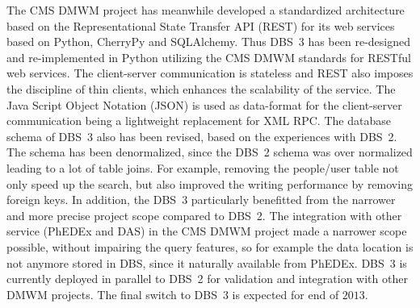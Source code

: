 The CMS DMWM project has meanwhile developed a standardized architecture based on the Representational State Transfer API (REST) \cite{REST} for its web services based on Python, CherryPy and SQLAlchemy. Thus DBS~3 has been re-designed and re-implemented in Python utilizing the CMS DMWM standards for RESTful web services. The client-server communication is stateless and REST also imposes the discipline of thin clients, which enhances the scalability of the service. The Java Script Object Notation (JSON) is used as data-format for the client-server communication being a lightweight replacement for XML RPC. The database schema of DBS~3 also has been revised, based on the experiences with DBS~2. The schema has been denormalized, since the DBS~2 schema was over normalized leading to a lot of table joins. For example, removing the people/user table not only speed up the search, but also improved the writing performance by removing foreign keys. In addition, the DBS~3 particularly benefitted from the narrower and more precise project scope compared to DBS~2. The integration with other service (PhEDEx and DAS) in the CMS DMWM project made a narrower scope possible, without impairing the query features, so for example the data location is not anymore stored in DBS, since it naturally available from PhEDEx. DBS~3 is currently deployed in parallel to DBS~2 for validation and integration with other DMWM projects. The final switch to DBS~3 is expected for end of $2013$.

